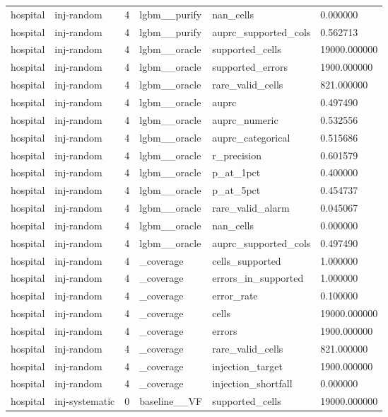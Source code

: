 \begin{tabular}{llllll}
hospital & inj-random & 4 & lgbm\_\_purify & nan\_cells & 0.000000 \\
hospital & inj-random & 4 & lgbm\_\_purify & auprc\_supported\_cols & 0.562713 \\
hospital & inj-random & 4 & lgbm\_\_oracle & supported\_cells & 19000.000000 \\
hospital & inj-random & 4 & lgbm\_\_oracle & supported\_errors & 1900.000000 \\
hospital & inj-random & 4 & lgbm\_\_oracle & rare\_valid\_cells & 821.000000 \\
hospital & inj-random & 4 & lgbm\_\_oracle & auprc & 0.497490 \\
hospital & inj-random & 4 & lgbm\_\_oracle & auprc\_numeric & 0.532556 \\
hospital & inj-random & 4 & lgbm\_\_oracle & auprc\_categorical & 0.515686 \\
hospital & inj-random & 4 & lgbm\_\_oracle & r\_precision & 0.601579 \\
hospital & inj-random & 4 & lgbm\_\_oracle & p\_at\_1pct & 0.400000 \\
hospital & inj-random & 4 & lgbm\_\_oracle & p\_at\_5pct & 0.454737 \\
hospital & inj-random & 4 & lgbm\_\_oracle & rare\_valid\_alarm & 0.045067 \\
hospital & inj-random & 4 & lgbm\_\_oracle & nan\_cells & 0.000000 \\
hospital & inj-random & 4 & lgbm\_\_oracle & auprc\_supported\_cols & 0.497490 \\
hospital & inj-random & 4 & \_coverage & cells\_supported & 1.000000 \\
hospital & inj-random & 4 & \_coverage & errors\_in\_supported & 1.000000 \\
hospital & inj-random & 4 & \_coverage & error\_rate & 0.100000 \\
hospital & inj-random & 4 & \_coverage & cells & 19000.000000 \\
hospital & inj-random & 4 & \_coverage & errors & 1900.000000 \\
hospital & inj-random & 4 & \_coverage & rare\_valid\_cells & 821.000000 \\
hospital & inj-random & 4 & \_coverage & injection\_target & 1900.000000 \\
hospital & inj-random & 4 & \_coverage & injection\_shortfall & 0.000000 \\
hospital & inj-systematic & 0 & baseline\_\_VF & supported\_cells & 19000.000000 \\

\end{tabular}
